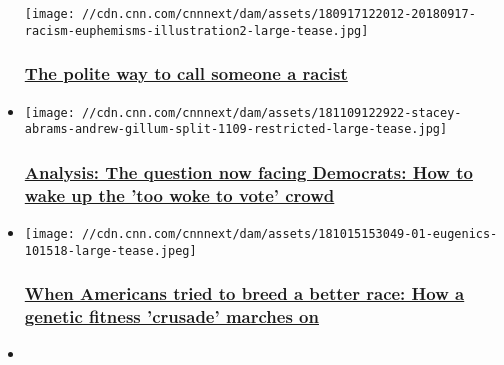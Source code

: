 \begin{itemize}
  \texttt{[image: //cdn.cnn.com/cnnnext/dam/assets/180917122012-20180917-racism-euphemisms-illustration2-large-tease.jpg]}

  \hypertarget{the-polite-way-to-call-someone-a-racist}{%
  \subsubsection{\texorpdfstring{\href{/2018/09/29/us/polite-racism/index.html}{The
  polite way to call someone a
  racist}}{The polite way to call someone a racist}}\label{the-polite-way-to-call-someone-a-racist}}
\item
  \href{/2018/11/09/us/georgia-florida-governors-races-analysis/index.html}{}

  \texttt{[image: //cdn.cnn.com/cnnnext/dam/assets/181109122922-stacey-abrams-andrew-gillum-split-1109-restricted-large-tease.jpg]}

  \hypertarget{analysis-the-question-now-facing-democrats-how-to-wake-up-the-too-woke-to-vote-crowd}{%
  \subsubsection{\texorpdfstring{\href{/2018/11/09/us/georgia-florida-governors-races-analysis/index.html}{Analysis:
  The question now facing Democrats: How to wake up the 'too woke to
  vote'
  crowd}}{Analysis: The question now facing Democrats: How to wake up the 'too woke to vote' crowd}}\label{analysis-the-question-now-facing-democrats-how-to-wake-up-the-too-woke-to-vote-crowd}}
\item
  \href{/2018/10/16/us/eugenics-craze-america-pbs/index.html}{}

  \texttt{[image: //cdn.cnn.com/cnnnext/dam/assets/181015153049-01-eugenics-101518-large-tease.jpeg]}

  \hypertarget{when-americans-tried-to-breed-a-better-race-how-a-genetic-fitness-crusade-marches-on}{%
  \subsubsection{\texorpdfstring{\href{/2018/10/16/us/eugenics-craze-america-pbs/index.html}{When
  Americans tried to breed a better race: How a genetic fitness
  'crusade' marches
  on}}{When Americans tried to breed a better race: How a genetic fitness 'crusade' marches on}}\label{when-americans-tried-to-breed-a-better-race-how-a-genetic-fitness-crusade-marches-on}}
\item
  \href{/2018/11/01/politics/trump-ad-blake-analysis/index.html}{}


\end{itemize}
